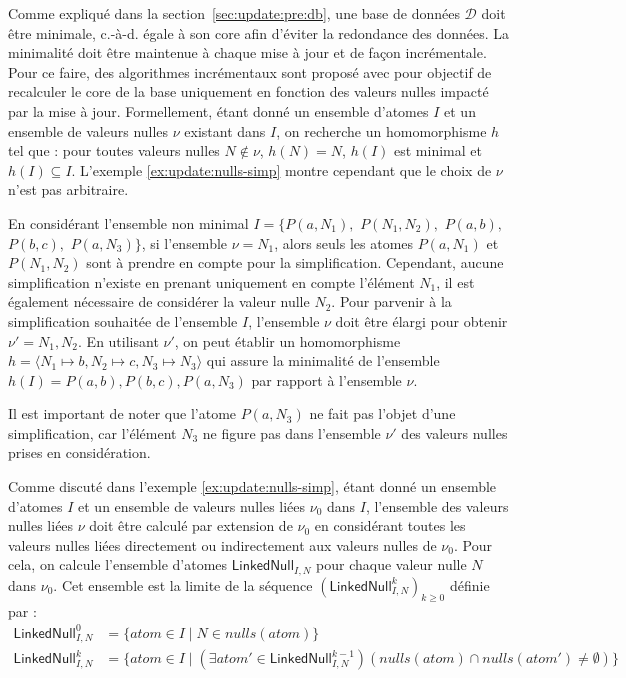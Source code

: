Comme expliqué dans la section~\ref{sec:update:pre:db}, une base de données $\mathcal{D}$ doit être minimale, c.-à-d. égale à son \gls{core} afin d'éviter la redondance des données.
La minimalité doit être maintenue à chaque mise à jour et de façon incrémentale.
Pour ce faire, des algorithmes incrémentaux sont proposé avec pour objectif de recalculer le \gls{core}  de la base uniquement en fonction des valeurs nulles impacté par la mise à jour.
Formellement, étant donné un ensemble d'atomes $I$ et un ensemble de valeurs nulles $\nu$ existant dans $I$, on recherche un homomorphisme $h$ tel que : pour toutes valeurs nulles $N \notin \nu$, $h(N) = N$, $h(I)$ est minimal et $h(I) \subseteq I$.
L'exemple \ref{ex:update:nulls-simp} montre cependant que le choix de $\nu$ n'est pas arbitraire.

\begin{example}
	\label{ex:update:nulls-simp}
	En considérant l'ensemble non minimal $I = \{P(a, N_1),$ $P(N_1, N_2),$ $P(a, b),$ $P(b, c),$ $P(a, N_3)\}$, si l'ensemble $\nu = {N_1}$, alors seuls les atomes $P(a, N_1)$ et $P(N_1, N_2)$ sont à prendre en compte pour la simplification.
	Cependant, aucune simplification n'existe en prenant uniquement en compte l'élément $N_1$, il est également nécessaire de considérer la valeur nulle $N_2$.
	Pour parvenir à la simplification souhaitée de l'ensemble $I$, l'ensemble $\nu$ doit être élargi pour obtenir $\nu' = {N_1, N_2}$.
	En utilisant $\nu'$, on peut établir un homomorphisme $h = \langle N_1 \mapsto b, N_2 \mapsto c, N_3 \mapsto N_3 \rangle$ qui assure la minimalité de l'ensemble $h(I) = {P(a, b), P(b, c), P(a, N_3)}$ par rapport à l'ensemble $\nu$.

	Il est important de noter que l'atome $P(a, N_3)$ ne fait pas l'objet d'une simplification, car l'élément $N_3$ ne figure pas dans l'ensemble $\nu'$ des valeurs nulles prises en considération.
\end{example}

Comme discuté dans l'exemple \ref{ex:update:nulls-simp}, étant donné un ensemble d'atomes $I$ et un ensemble de valeurs nulles liées $\nu_0$ dans $I$, l'ensemble des valeurs nulles liées $\nu$ doit être calculé par extension de $\nu_0$ en considérant toutes les valeurs nulles liées directement ou indirectement aux valeurs nulles de $\nu_0$.
Pour cela, on calcule l'ensemble d'atomes $\textsf{LinkedNull}_{I,N}$ pour chaque valeur nulle $N$ dans $\nu_0$.
Cet ensemble est la limite de la séquence $(\textsf{LinkedNull}^k_{I,N})_{k \ge 0}$ définie par :
\begin{align}
	\textsf{LinkedNull}^0_{I,N} & = \{atom \in I \mid N \in nulls(atom)\}                                                                                 \\
	\textsf{LinkedNull}^k_{I,N} & = \{atom \in I \mid (\exists atom' \in \textsf{LinkedNull}^{k-1}_{I,N})(nulls(atom) \cap nulls(atom') \neq \emptyset)\}
\end{align}

